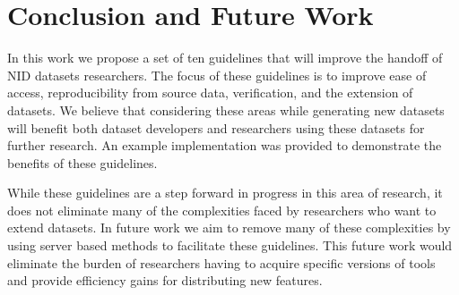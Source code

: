 \documentclass[sigconf]{acmart}
\begin{document}
\section{Conclusion and Future Work}\label{sec:conclusion}
In this work we propose a set of ten guidelines that will improve the handoff of NID datasets researchers.
The focus of these guidelines is to improve ease of access, reproducibility from source data, verification, and the extension of datasets.
We believe that considering these areas while generating new datasets will benefit both dataset developers and researchers using these datasets for further research.
An example implementation was provided to demonstrate the benefits of these guidelines.

While these guidelines are a step forward in progress in this area of research, it does not eliminate many of the complexities faced by researchers who want to extend datasets.
In future work we aim to remove many of these complexities by using server based methods to facilitate these guidelines.
This future work would eliminate the burden of researchers having to acquire specific versions of tools and provide efficiency gains for distributing new features.



\end{document}
